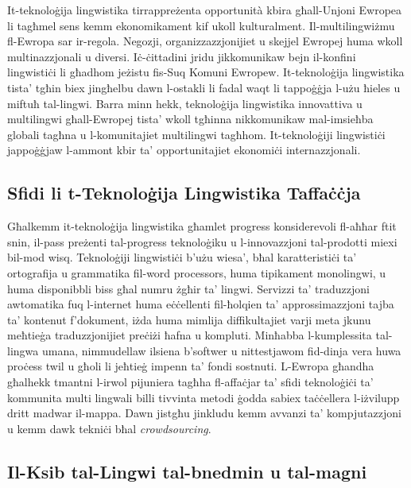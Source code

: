 \documentclass[]{../../metanetpaper}
\begin{document}
\begin{multicols}{2}

It-teknoloġija lingwistika tirrappreżenta opportunità kbira għall-Unjoni Ewropea li tagħmel sens kemm ekonomikament kif ukoll kulturalment. Il-multilingwiżmu fl-Ewropa sar ir-regola. Negozji, organizzazzjonijiet u skejjel Ewropej huma wkoll multinazzjonali u diversi. Iċ-ċittadini jridu jikkomunikaw bejn il-konfini lingwistiċi li għadhom jeżistu fis-Suq Komuni Ewropew. It-teknoloġija lingwistika tista’ tgħin biex jingħelbu dawn l-ostakli li fadal waqt li tappoġġja l-użu ħieles u miftuħ tal-lingwi. Barra minn hekk, teknoloġija lingwistika innovattiva u multilingwi   għall-Ewropej tista’ wkoll tgħinna nikkomunikaw mal-imsieħba globali tagħna u l-komunitajiet multilingwi tagħhom. It-teknoloġiji lingwistiċi jappoġġjaw l-ammont kbir ta’ opportunitajiet ekonomiċi internazzjonali.

\subsection{Sfidi li t-Teknoloġija Lingwistika Taffaċċja}

Għalkemm it-teknoloġija lingwistika għamlet progress konsiderevoli fl-aħħar ftit snin, il-pass preżenti tal-progress teknoloġiku u l-innovazzjoni tal-prodotti miexi bil-mod wisq. Teknoloġiji lingwistiċi b’użu wiesa’, bħal karatteristiċi ta’ ortografija u grammatika fil-word processors, huma tipikament monolingwi, u huma disponibbli biss għal numru żgħir ta’ lingwi. Servizzi ta' traduzzjoni awtomatika fuq l-internet huma eċċellenti fil-ħolqien ta’ approssimazzjoni tajba ta’ kontenut f’dokument, iżda huma mimlija diffikultajiet varji meta jkunu meħtieġa traduzzjonijiet preċiżi ħafna u kompluti. Minħabba l-kumplessita tal-lingwa umana, nimmudellaw ilsiena b’softwer u nittestjawom fid-dinja vera huwa proċess twil u għoli li jeħtieġ impenn ta’ fondi sostnuti. L-Ewropa għandha għalhekk tmantni l-irwol pijuniera tagħha fl-affaċjar ta’ sfidi teknoloġiċi ta’ kommunita multi lingwali billi tivvinta metodi ġodda sabiex taċċellera l-iżvilupp dritt madwar il-mappa. Dawn jistgħu jinkludu kemm avvanzi ta’ kompjutazzjoni u kemm dawk tekniċi bħal \emph{crowdsourcing}.


\subsection{Il-Ksib tal-Lingwi tal-bnedmin u tal-magni}


\end{multicols}
\end{document}
